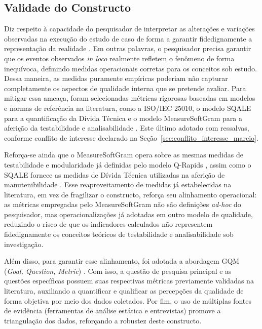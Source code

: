 \subsection{Validade do Constructo}
\label{sec:validade_constructo}

Diz respeito à capacidade do pesquisador de interpretar as alterações e variações observadas na execução do estudo de caso de forma a garantir fidedignamente a representação da realidade \cite{yin2001estudo}. Em outras palavras, o pesquisador precisa garantir que os eventos observados \textit{in loco} realmente refletem o fenômeno de forma inequívoca, definindo medidas operacionais corretas para os conceitos sob estudo. Dessa maneira, as medidas puramente empíricas poderiam não capturar completamente os aspectos de qualidade interna que se pretende avaliar. Para mitigar essa ameaça, foram selecionadas métricas rigorosas baseadas em modelos e normas de referência na literatura, como a ISO/IEC 25010, o modelo SQALE para a quantificação da Dívida Técnica \cite{letouzey2010} e o modelo MeasureSoftGram para a aferição da testabilidade e analisabilidade \cite{neri2020}. Este último adotado com ressalvas, conforme conflito de interesse declarado na Seção~\ref{sec:conflito_interesse_marcio}.

Reforça-se ainda que o MeasureSoftGram opera sobre as mesmas medidas de testabilidade e modularidade já definidas pelo modelo Q-Rapids \cite{qrapids2019}, assim como o SQALE fornece as medidas de Dívida Técnica utilizadas na aferição de manutenibilidade \cite{letouzey2010}. Esse reaproveitamento de medidas já estabelecidas na literatura, em vez de fragilizar o constructo, reforça seu alinhamento operacional: as métricas empregadas pelo MeasureSoftGram não são definições \textit{ad-hoc} do pesquisador, mas operacionalizações já adotadas em outro modelo de qualidade, reduzindo o risco de que os indicadores calculados não representem fidedignamente os conceitos teóricos de testabilidade e analisabilidade sob investigação.

Além disso, para garantir esse alinhamento, foi adotada a abordagem GQM (\textit{Goal, Question, Metric}) \cite{basili1994}. Com isso, a questão de pesquisa principal e as questões específicas possuem suas respectivas métricas previamente validadas na literatura, auxiliando a quantificar e qualificar as percepções da qualidade de forma objetiva por meio dos dados coletados. Por fim, o uso de múltiplas fontes de evidência (ferramentas de análise estática e entrevistas) promove a triangulação dos dados, reforçando a robustez deste constructo.

